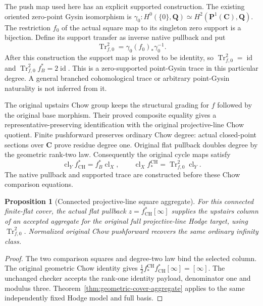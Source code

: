\documentclass[11pt]{article}
\newtheorem{proposition}[theorem]{Proposition}
\theoremstyle{definition}
\theoremstyle{remark}
\DeclareMathOperator{\CH}{CH}
\begin{document}
The push map used here has an explicit supported construction. The
existing oriented zero-point Gysin isomorphism is
\(\gamma_0:H^0(\{0\},\mathbf Q)\simeq H^2(\mathbf P^1(\mathbf C),\mathbf Q)\).
The restriction \(f_0\) of the actual square map to its singleton zero
support is a bijection. Define its support transfer as inverse native
pullback and put
\[
 \operatorname{Tr}^{2}_{f,0}
    =\gamma_0(f_0)_*\gamma_0^{-1}.
\]
After this construction the support map is proved to be identity, so
\(\operatorname{Tr}^{2}_{f,0}=\operatorname{id}\) and
\(\operatorname{Tr}^{2}_{f,0}f_B^*=2\operatorname{id}\).
This is a zero-supported point-Gysin trace in this particular degree.
A general branched cohomological trace or arbitrary point-Gysin
naturality is not inferred from it.

The original upstairs Chow group keeps the structural grading for
\(f\) followed by the original base morphism. Their proved composite
equality gives a representative-preserving identification with the
original projective-line Chow quotient. Finite pushforward preserves
ordinary Chow degree: actual closed-point sections over \(\mathbf C\)
prove residue degree one. Original flat pullback doubles degree by the
geometric rank-two law. Consequently the original cycle maps satisfy
\[
 \operatorname{cl}_Y f_{\CH}^*=f_B^*\operatorname{cl}_X,
 \qquad
 \operatorname{cl}_X f_*^{\CH}
       =\operatorname{Tr}^{2}_{f,0}\operatorname{cl}_Y.
\]
The native pullback and supported trace are constructed before these
Chow comparison equations.

\begin{proposition}[Connected projective-line square aggregate]
\label{prop:p1-square-aggregate}
For this connected finite-flat cover, the actual flat pullback
\(z=f_{\CH}^*[\infty]\) supplies the upstairs column of an accepted
aggregate for the original full projective-line Hodge target, using
\(\operatorname{Tr}^{2}_{f,0}\). Normalized original Chow pushforward
recovers the same ordinary infinity class.
\end{proposition}
\begin{proof}
The two comparison squares and degree-two law bind the selected column.
The original geometric Chow identity gives
\(\tfrac12 f_*^{\CH} f_{\CH}^*[\infty]=[\infty]\).
The unchanged checker accepts the rank-one identity payload, denominator
one and modulus three. Theorem~\ref{thm:geometric-cover-aggregate}
applies to the same independently fixed Hodge model and full basis.
\end{proof}
\end{document}
